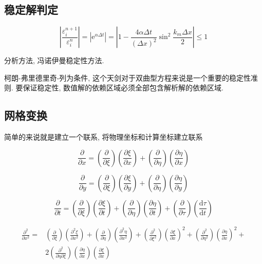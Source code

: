 \documentclass[UTF8]{ctexart}
\begin{document}
\subsection{稳定解判定}
$$
	\left|\frac{\varepsilon_{i}^{n+1}}{\varepsilon_{i}^{n}}\right|=\left|\mathrm{e}^{\alpha \Delta t}\right|=\left|1-\frac{4 \alpha \Delta t}{(\Delta x)^{2}} \sin ^{2} \frac{k_{m} \Delta x}{2}\right| \leqslant 1
$$

分析方法, 冯诺伊曼稳定性方法.

柯朗-弗里德里奇-列为条件, 这个天剑对于双曲型方程来说是一个重要的稳定性准则. 要保证稳定性, 数值解的依赖区域必须全部包含解析解的依赖区域.

\subsection{网格变换}
简单的来说就是建立一个联系, 将物理坐标和计算坐标建立联系

$$
	\frac{\partial}{\partial x}=\left(\frac{\partial}{\partial \xi}\right)\left(\frac{\partial \xi}{\partial x}\right)+\left(\frac{\partial}{\partial \eta}\right)\left(\frac{\partial \eta}{\partial x}\right)
$$

$$
	\frac{\partial}{\partial y}=\left(\frac{\partial}{\partial \xi}\right)\left(\frac{\partial \xi}{\partial y}\right)+\left(\frac{\partial}{\partial \eta}\right)\left(\frac{\partial \eta}{\partial y}\right)
$$

$$
	\frac{\partial}{\partial t}=\left(\frac{\partial}{\partial \xi}\right)\left(\frac{\partial \xi}{\partial t}\right)+\left(\frac{\partial}{\partial \eta}\right)\left(\frac{\partial \eta}{\partial t}\right)+\left(\frac{\partial}{\partial \tau}\right)\left(\frac{\mathrm{d} \tau}{\mathrm{d} t}\right)
$$

$$
	\begin{aligned}
		\frac{\partial^{2}}{\partial x^{2}}= & \left(\frac{\partial}{\partial \xi}\right)\left(\frac{\partial^{2} \xi}{\partial x^{2}}\right)+\left(\frac{\partial}{\partial \eta}\right)\left(\frac{\partial^{2} \eta}{\partial x^{2}}\right)+\left(\frac{\partial^{2}}{\partial \xi^{2}}\right)\left(\frac{\partial \xi}{\partial x}\right)^{2}+\left(\frac{\partial^{2}}{\partial \eta^{2}}\right)\left(\frac{\partial \eta}{\partial x}\right)^{2}+ \\
		                                     & 2\left(\frac{\partial^{2}}{\partial \eta \partial \xi}\right)\left(\frac{\partial \eta}{\partial x}\right)\left(\frac{\partial \xi}{\partial x}\right)
	\end{aligned}
$$
\end{document}

